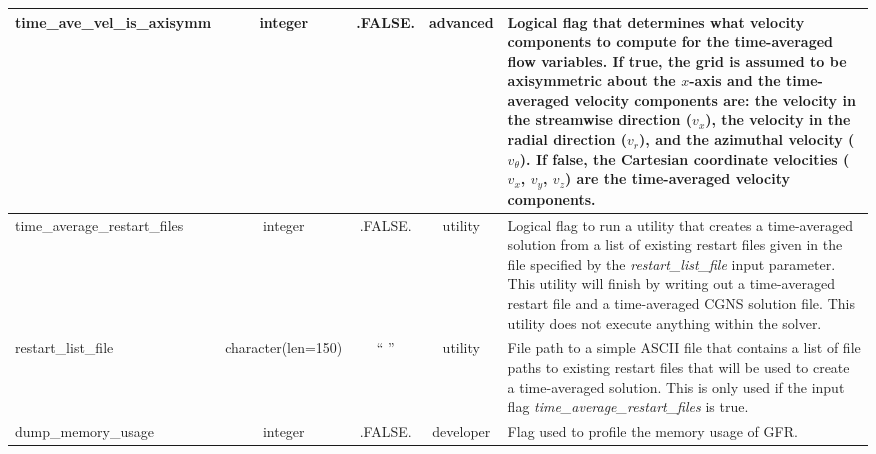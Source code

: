 \documentclass[letterpaper,10pt]{article}
\newcommand{\sladv}{advanced}
\newcommand{\sldev}{developer}
\newcommand{\slutl}{utility}
\newcommand{\typlog}{integer}
\newcommand{\tc}[1][150]{character(len=#1)}
\newcommand{\fls}{.FALSE.}
\newcommand{\minorline}{\hline}
\newcommand{\groupline}[1]{}
\newlength{\colEwidth}
\newcommand{\descriptionbegin}{}
\newcommand{\descriptionend}{\\ \minorline}
\begin{document}
\begin{longtable}{ | l | c | c | c | p{\colEwidth} | }
    \descriptionend
    time\_ave\_vel\_is\_axisymm & \typlog & \fls        & \sladv &
    \descriptionbegin
    Logical flag that determines what velocity components to compute for the
    time-averaged flow variables. If true, the grid is assumed to be
    axisymmetric about the $x$-axis and the time-averaged velocity components
    are: the velocity in the streamwise direction ($v_x$), the velocity in the
    radial direction ($v_r$), and the azimuthal velocity ($v_\theta$). If false,
    the Cartesian coordinate velocities ($v_x$, $v_y$, $v_z$) are the
    time-averaged velocity components.
    \descriptionend

    \groupline{UTILITY TO TIME AVERAGE EXISTING RESTART FILES}
    time\_average\_restart\_files & \typlog & \fls  & \slutl &
    \descriptionbegin
    Logical flag to run a utility that creates a time-averaged solution from a
    list of existing restart files given in the file specified by the
    \textsl{restart\_list\_file} input parameter. This utility will finish by
    writing out a time-averaged restart file and a time-averaged CGNS solution
    file. This utility does not execute anything within the solver.
    \descriptionend
    restart\_list\_file           & \tc     & `` '' & \slutl &
    \descriptionbegin
    File path to a simple ASCII file that contains a list of file paths to
    existing restart files that will be used to create a time-averaged solution.
    This is only used if the input flag \textsl{time\_average\_restart\_files}
    is true.
    \descriptionend

    \groupline{MEMORY USAGE}
    dump\_memory\_usage & \typlog & \fls & \sldev &
    \descriptionbegin
    Flag used to profile the memory usage of GFR.
    \descriptionend


\end{longtable}
\end{document}
